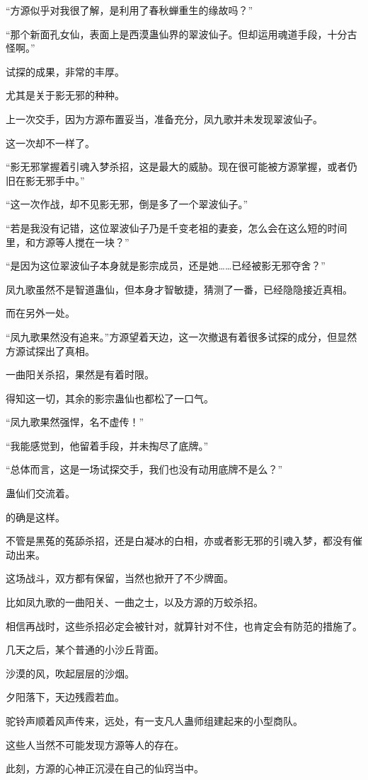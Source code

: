 \begin{this_body}
“方源似乎对我很了解，是利用了春秋蝉重生的缘故吗？”

“那个新面孔女仙，表面上是西漠蛊仙界的翠波仙子。但却运用魂道手段，十分古怪啊。”

试探的成果，非常的丰厚。

尤其是关于影无邪的种种。

上一次交手，因为方源布置妥当，准备充分，凤九歌并未发现翠波仙子。

这一次却不一样了。

“影无邪掌握着引魂入梦杀招，这是最大的威胁。现在很可能被方源掌握，或者仍旧在影无邪手中。”

“这一次作战，却不见影无邪，倒是多了一个翠波仙子。”

“若是我没有记错，这位翠波仙子乃是千变老祖的妻妾，怎么会在这么短的时间里，和方源等人搅在一块？”

“是因为这位翠波仙子本身就是影宗成员，还是她……已经被影无邪夺舍？”

凤九歌虽然不是智道蛊仙，但本身才智敏捷，猜测了一番，已经隐隐接近真相。

而在另外一处。

“凤九歌果然没有追来。”方源望着天边，这一次撤退有着很多试探的成分，但显然方源试探出了真相。

一曲阳关杀招，果然是有着时限。

得知这一切，其余的影宗蛊仙也都松了一口气。

“凤九歌果然强悍，名不虚传！”

“我能感觉到，他留着手段，并未掏尽了底牌。”

“总体而言，这是一场试探交手，我们也没有动用底牌不是么？”

蛊仙们交流着。

的确是这样。

不管是黑菟的菟舔杀招，还是白凝冰的白相，亦或者影无邪的引魂入梦，都没有催动出来。

这场战斗，双方都有保留，当然也掀开了不少牌面。

比如凤九歌的一曲阳关、一曲之士，以及方源的万蛟杀招。

相信再战时，这些杀招必定会被针对，就算针对不住，也肯定会有防范的措施了。

几天之后，某个普通的小沙丘背面。

沙漠的风，吹起层层的沙烟。

夕阳落下，天边残霞若血。

驼铃声顺着风声传来，远处，有一支凡人蛊师组建起来的小型商队。

这些人当然不可能发现方源等人的存在。

此刻，方源的心神正沉浸在自己的仙窍当中。


\end{this_body}
